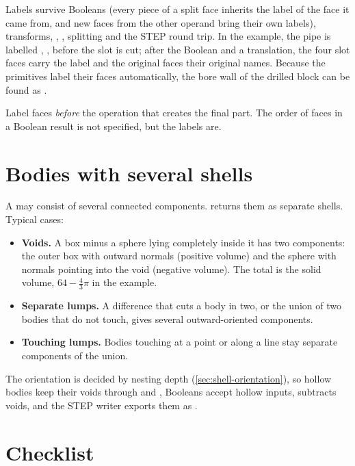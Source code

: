 Labels survive Booleans (every piece of a split face inherits the label of the face it came
from, and new faces from the other operand bring their own labels), transforms,
, , splitting and the STEP round trip. In the example, the
pipe is labelled , ,  before the slot is cut; after the
Boolean and a translation, the four slot faces carry the label  and the original
faces their original names. Because the primitives label their faces automatically, the bore
wall of the drilled block can be found as .

\begin{tip}
Label faces \emph{before} the operation that creates the final part. The order of faces in a
Boolean result is not specified, but the labels are.
\end{tip}

\section{Bodies with several shells}\label{sec:voids}

A  may consist of several connected components.  returns them
as separate shells. Typical cases:

\begin{itemize}
\item \textbf{Voids.} A box minus a sphere lying completely inside it has two components:
the outer box with outward normals (positive volume) and the sphere with normals pointing
into the void (negative volume). The total  is the solid volume,
$64 - \tfrac43\pi$ in the example.
\item \textbf{Separate lumps.} A difference that cuts a body in two, or the union of two
bodies that do not touch, gives several outward-oriented components.
\item \textbf{Touching lumps.} Bodies touching at a point or along a line stay separate
components of the union.
\end{itemize}

The orientation is decided by nesting depth (\cref{sec:shell-orientation}), so hollow
bodies keep their voids through  and , Booleans accept
hollow inputs,  subtracts voids, and the STEP writer exports them as
.

\section{Checklist}\label{sec:solids-checklist}

